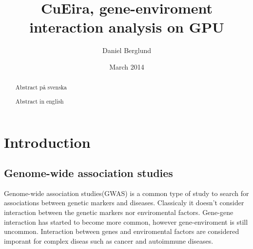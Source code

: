 \documentclass[10pt,a4paper]{article}
\title{CuEira, gene-enviroment interaction analysis on GPU}
\author{Daniel Berglund}
\date{March 2014}
\makeatletter
\newcommand\ackname{Acknowledgements}
\newenvironment{acknowledgements}{
      \titlepage
      \null\vfil
      \@beginparpenalty\@lowpenalty
      \begin{center}%
        \bfseries \ackname
        \@endparpenalty\@M
      \end{center}}%
     {\par\vfil\null\endtitlepage}
\newenvironment{acknowledgements}{
      \if@twocolumn
        \section*{\abstractname}
      \else
        \small
        \begin{center}
          {\bfseries \ackname\vspace{-.5em}\vspace{\z@}}
        \end{center}
        \quotation
      \fi}
      {\if@twocolumn\else\endquotation\fi}
\makeatother
\begin{document}
\maketitle

\clearpage
{}
\begin{abstract}
Abstract på svenska
\end{abstract}
\clearpage
{}
\begin{abstract}
Abstract in english
\end{abstract}
\clearpage
\tableofcontents
\newpage

\section{Introduction}



\subsection{Genome-wide association studies}
Genome-wide association studies(GWAS) is a common type of study to search for associations between genetic markers and diseases. Classicaly it doesn't consider interaction between the genetic markers nor enviromental factors. Gene-gene interaction has started to become more common\cite{cordell_detect_review}, however gene-enviroment is still uncommon\cite{gene_enviroment_2013}. Interaction between genes and enviromental factors are considered imporant for complex diseas such as cancer and autoimmune diseases. \cite{cordell_detect_review, gene_enviroment_2013, geira, ra_smoking}\\
\\
\end{document}
